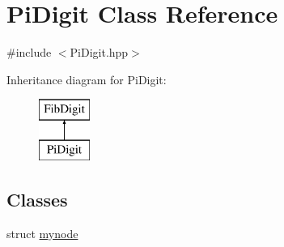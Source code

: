 \hypertarget{classPiDigit}{}\section{Pi\+Digit Class Reference}
\label{classPiDigit}


{\ttfamily \#include $<$Pi\+Digit.\+hpp$>$}

Inheritance diagram for Pi\+Digit\+:\begin{figure}[H]
\begin{center}
\leavevmode
\includegraphics[height=2.000000cm]{classPiDigit}
\end{center}
\end{figure}
\subsection*{Classes}
\begin{DoxyCompactItemize}
\item 
struct \mbox{\hyperlink{structPiDigit_1_1mynode}{mynode}}
\end{DoxyCompactItemize}
